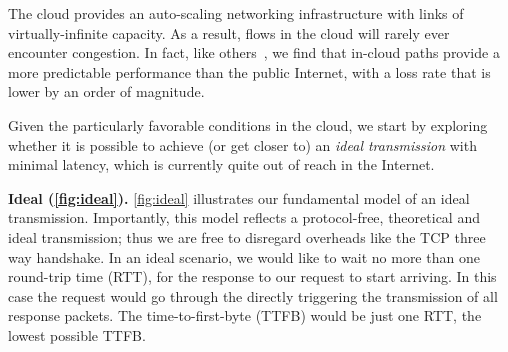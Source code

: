 %


The cloud provides an auto-scaling networking infrastructure with links of virtually-infinite capacity. As a result, flows in the cloud will rarely ever encounter congestion. In fact, like others~\cite{haq2017measuring}, we find that in-cloud paths provide a more predictable performance than the public Internet, with a loss rate that is lower by an order of magnitude. 

Given the particularly favorable conditions in the cloud, we start by exploring whether it is possible to achieve (or get closer to) an \textit{ideal transmission} with minimal latency, which is currently quite out of reach in the Internet. 

\textbf{Ideal (\autoref{fig:ideal}).} 
\autoref{fig:ideal} illustrates our fundamental model of an ideal transmission. Importantly, this model reflects a protocol-free, theoretical and ideal transmission; thus we are free to disregard overheads like the TCP three way handshake. In an ideal scenario, we would like to wait no more than one round-trip time (RTT), for the response to our request to start arriving. In this case the request would go through the \relays directly triggering the transmission of all response packets. The time-to-first-byte (TTFB) would be just one RTT, the lowest possible TTFB.


